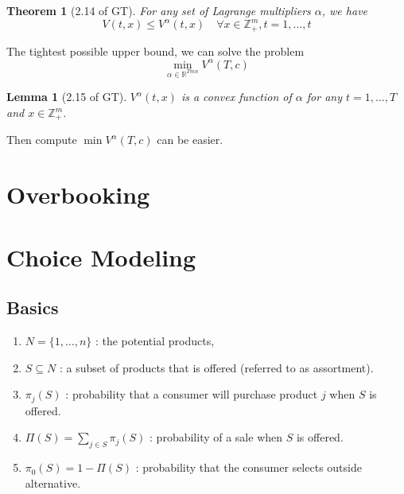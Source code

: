 \documentclass[11pt,a4paper]{article}
\newtheorem{theorem}{Theorem}
\newtheorem{lemma}{Lemma}
\begin{document}
\begin{theorem}[2.14 of GT]
    For any set of Lagrange multipliers $\alpha$, we have
    $$V(t,x)\leq V^{\alpha}(t,x)\quad \forall x\in \mathbb{Z}_+^m,t=1,...,t$$
\end{theorem}

The tightest possible upper bound, we can solve the problem$$\min_{\alpha\in \mathbb{R}^{Tmn}} V^{\alpha}(T,c)$$

\begin{lemma}[2.15 of GT]
    $V^{\alpha}(t,x)$ is a convex function of $\alpha$ for any $t=1,...,T$ and $x\in \mathbb{Z}_+^m$.
\end{lemma}
Then compute $\min V^{\alpha}(T,c)$ can be easier.

\section{Overbooking}

\section{Choice Modeling}
\begin{center}
\end{center}
\subsection{Basics}
\begin{enumerate}[$\bullet$]
    \item $N=\{1, \ldots, n\}$ : the potential products,
    \item $S \subseteq N$ : a subset of products that is offered (referred to as assortment).
    \item $\pi_{j}(S)$ : probability that a consumer will purchase product $j$ when $S$ is offered.
    \item $\Pi(S)=\sum_{j \in S} \pi_{j}(S)$ : probability of a sale when $S$ is offered.
    \item $\pi_{0}(S)=1-\Pi(S)$ : probability that the consumer selects outside alternative.
\end{enumerate}
\end{document}
